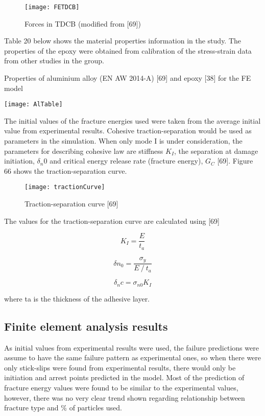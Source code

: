 \documentclass[numbers=noendperiod,chapterprefix=on]{icldt} %
\begin{document}
\begin{figure}[!htpb]
\centering
\texttt{[image: FETDCB]}
\caption{Forces in TDCB (modified from [69])}
\end{figure}

Table 20 below shows the material properties information in the study. The properties of the epoxy were obtained from calibration of the stress-strain data from other studies in the group.


\begin{table}[!htpb]
\centering
\caption{Properties of aluminium alloy (EN AW 2014-A) [69] and epoxy [38] for the FE model} %
\texttt{[image: AlTable]}
\end{table}

The initial values of the fracture energies used were taken from the average initial value from experimental results.
Cohesive traction-separation would be used as parameters in the simulation. When only mode I is under consideration, the parameters for describing cohesive law are stiffness $K_I$, the separation at damage initiation, $\delta_n0$ and critical energy release rate (fracture energy), $G_C$ [69]. Figure 66 shows the traction-separation curve. 

\begin{figure}[!htpb]
\centering
\texttt{[image: tractionCurve]}
\caption{Traction-separation curve [69]}
\end{figure}

The values for the traction-separation curve are calculated using [69]

\begin{equation} 
K_I  =\frac{E}{t_a}
\end{equation}

\begin{equation} 
\delta n_0=\frac{\sigma_y}{E⁄t_a}
\end{equation}

\begin{equation} 
\delta_nc=\sigma_{n0} K_I
\end{equation}

where ta is the thickness of the adhesive layer. 


\subsection{Finite element analysis results}
As initial values from experimental results were used, the failure predictions were assume to have the same failure pattern as experimental ones, so when there were only stick-slips were found from experimental results, there would only be initiation and arrest points predicted in the model. Most of the prediction of fracture energy values were found to be similar to the experimental values, however, there was no very clear trend shown regarding relationship between fracture type and \% of particles used.
\end{document}
